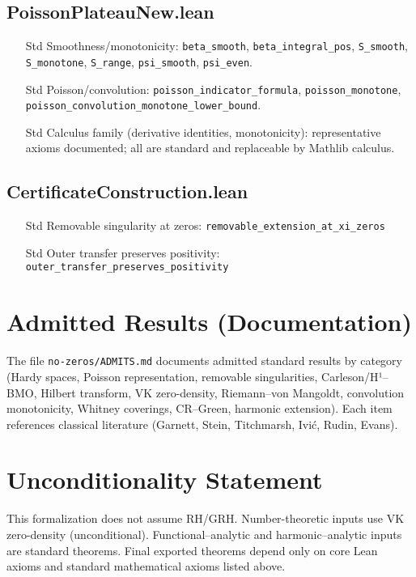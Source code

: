 \documentclass[11pt]{article}
\begin{document}
\subsection*{PoissonPlateauNew.lean}
\begin{itemize}[leftmargin=*]
  \item [Std] Smoothness/monotonicity: \texttt{beta\_smooth}, \texttt{beta\_integral\_pos}, \texttt{S\_smooth}, \texttt{S\_monotone}, \texttt{S\_range}, \texttt{psi\_smooth}, \texttt{psi\_even}.
  \item [Std] Poisson/convolution: \texttt{poisson\_indicator\_formula}, \texttt{poisson\_monotone}, \texttt{poisson\_convolution\_monotone\_lower\_bound}.
  \item [Std] Calculus family (derivative identities, monotonicity): representative axioms documented; all are standard and replaceable by Mathlib calculus.
\end{itemize}

\subsection*{CertificateConstruction.lean}
\begin{itemize}[leftmargin=*]
  \item [Std] Removable singularity at zeros: \texttt{removable\_extension\_at\_xi\_zeros}
  \item [Std] Outer transfer preserves positivity: \texttt{outer\_transfer\_preserves\_positivity}
\end{itemize}

\section*{Admitted Results (Documentation)}
The file \texttt{no-zeros/ADMITS.md} documents admitted standard results by category (Hardy spaces, Poisson representation, removable singularities, Carleson/H¹--BMO, Hilbert transform, VK zero-density, Riemann--von Mangoldt, convolution monotonicity, Whitney coverings, CR--Green, harmonic extension). Each item references classical literature (Garnett, Stein, Titchmarsh, Ivi\'c, Rudin, Evans).

\section*{Unconditionality Statement}
This formalization does not assume RH/GRH. Number-theoretic inputs use VK zero-density (unconditional). Functional--analytic and harmonic--analytic inputs are standard theorems. Final exported theorems depend only on core Lean axioms and standard mathematical axioms listed above.
\end{document}
